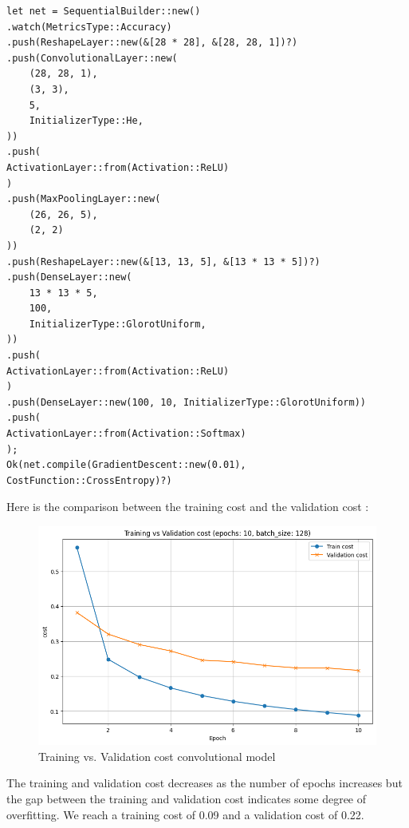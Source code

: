 \documentclass[a4paper, twocolumn, twoside]{article}
\begin{document}
     \begin{verbatim}
let net = SequentialBuilder::new()
.watch(MetricsType::Accuracy)
.push(ReshapeLayer::new(&[28 * 28], &[28, 28, 1])?)
.push(ConvolutionalLayer::new(
    (28, 28, 1),
    (3, 3),
    5,
    InitializerType::He,
))
.push(
ActivationLayer::from(Activation::ReLU)
)
.push(MaxPoolingLayer::new(
    (26, 26, 5),
    (2, 2)
))
.push(ReshapeLayer::new(&[13, 13, 5], &[13 * 13 * 5])?)
.push(DenseLayer::new(
    13 * 13 * 5,
    100,
    InitializerType::GlorotUniform,
))
.push(
ActivationLayer::from(Activation::ReLU)
)
.push(DenseLayer::new(100, 10, InitializerType::GlorotUniform))
.push(
ActivationLayer::from(Activation::Softmax)
);
Ok(net.compile(GradientDescent::new(0.01), CostFunction::CrossEntropy)?)
	\end{verbatim}
    Here is the comparison between the training cost and the validation cost :
	\begin{figure}[H]
		\begin{center}
			\includegraphics[width=\columnwidth]{images/cost_conv.png}
		\end{center}
		\caption{Training vs. Validation cost convolutional model}\label{fig:cost_conv}
	\end{figure}

    The training and validation cost decreases as the number of epochs increases but the gap between the training and validation cost indicates some degree of overfitting.
    We reach a training cost of 0.09 and a validation cost of 0.22. 
\end{document}
